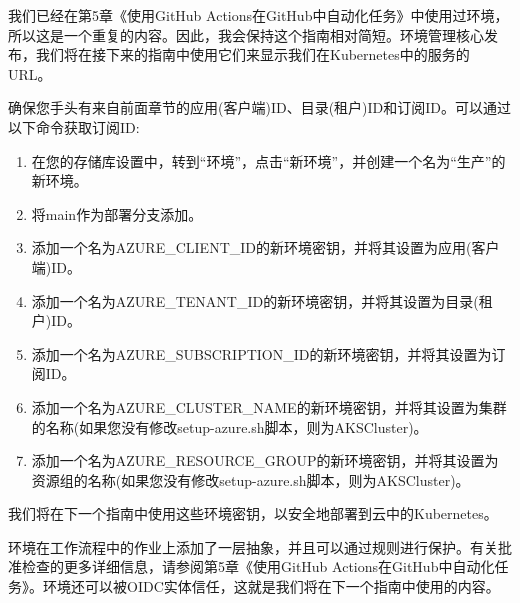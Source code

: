 我们已经在第5章《使用GitHub Actions在GitHub中自动化任务》中使用过环境，所以这是一个重复的内容。因此，我会保持这个指南相对简短。环境管理核心发布，我们将在接下来的指南中使用它们来显示我们在Kubernetes中的服务的URL。


确保您手头有来自前面章节的应用(客户端)ID、目录(租户)ID和订阅ID。可以通过以下命令获取订阅ID:



\begin{enumerate}
\item 
在您的存储库设置中，转到“环境”，点击“新环境”，并创建一个名为“生产”的新环境。

\item 
将main作为部署分支添加。

\item 
添加一个名为AZURE\_CLIENT\_ID的新环境密钥，并将其设置为应用(客户端)ID。

\item 
添加一个名为AZURE\_TENANT\_ID的新环境密钥，并将其设置为目录(租户)ID。

\item 
添加一个名为AZURE\_SUBSCRIPTION\_ID的新环境密钥，并将其设置为订阅ID。

\item 
添加一个名为AZURE\_CLUSTER\_NAME的新环境密钥，并将其设置为集群的名称(如果您没有修改setup-azure.sh脚本，则为AKSCluster)。

\item 
添加一个名为AZURE\_RESOURCE\_GROUP的新环境密钥，并将其设置为资源组的名称(如果您没有修改setup-azure.sh脚本，则为AKSCluster)。
\end{enumerate}

我们将在下一个指南中使用这些环境密钥，以安全地部署到云中的Kubernetes。


环境在工作流程中的作业上添加了一层抽象，并且可以通过规则进行保护。有关批准检查的更多详细信息，请参阅第5章《使用GitHub Actions在GitHub中自动化任务》。环境还可以被OIDC实体信任，这就是我们将在下一个指南中使用的内容。